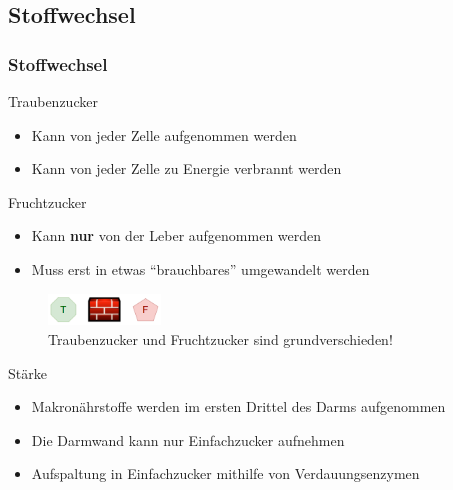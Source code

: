 \documentclass[xcolor=dvipsnames]{beamer}
\begin{document}
    \subsection{Stoffwechsel}
    \begin{frame}[allowframebreaks]
        \frametitle{Stoffwechsel}

        \begin{block}{Traubenzucker}
            \begin{itemize}
                \setlength\itemsep{1em}
                \item Kann von jeder Zelle aufgenommen werden
                \item Kann von jeder Zelle zu Energie verbrannt werden
            \end{itemize}
        \end{block}

        \begin{block}{Fruchtzucker}
            \begin{itemize}
                \setlength\itemsep{1em}
                \item Kann \textbf{nur} von der Leber aufgenommen werden
                \item Muss erst in etwas "`brauchbares"' umgewandelt werden
            \end{itemize}
        \end{block}

        \begin{figure}
            \centering
            \includegraphics[width=3cm]{../images/wall.png}
            \caption{Traubenzucker und Fruchtzucker sind grundverschieden!}
        \end{figure}

        \framebreak

        \begin{block}{Stärke}
            \begin{itemize}
                \item Makronährstoffe werden im ersten Drittel des Darms aufgenommen
                \item Die Darmwand kann nur Einfachzucker aufnehmen
                \item Aufspaltung in Einfachzucker mithilfe von Verdauungsenzymen
            \end{itemize}
        \end{block}


\end{frame}
\end{document}
